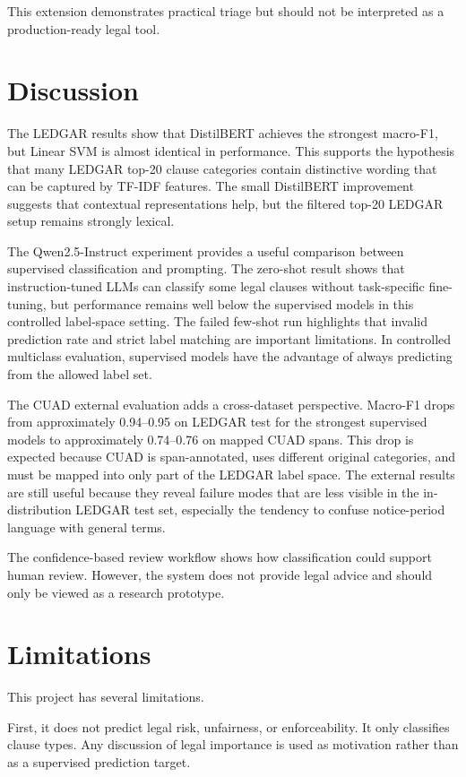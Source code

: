 \documentclass[11pt]{article}
\begin{document}
This extension demonstrates practical triage but should not be interpreted as a production-ready legal tool.

\section{Discussion}

The LEDGAR results show that DistilBERT achieves the strongest macro-F1, but Linear SVM is almost identical in performance. This supports the hypothesis that many LEDGAR top-20 clause categories contain distinctive wording that can be captured by TF-IDF features. The small DistilBERT improvement suggests that contextual representations help, but the filtered top-20 LEDGAR setup remains strongly lexical.

The Qwen2.5-Instruct experiment provides a useful comparison between supervised classification and prompting. The zero-shot result shows that instruction-tuned LLMs can classify some legal clauses without task-specific fine-tuning, but performance remains well below the supervised models in this controlled label-space setting. The failed few-shot run highlights that invalid prediction rate and strict label matching are important limitations. In controlled multiclass evaluation, supervised models have the advantage of always predicting from the allowed label set.

The CUAD external evaluation adds a cross-dataset perspective. Macro-F1 drops from approximately 0.94--0.95 on LEDGAR test for the strongest supervised models to approximately 0.74--0.76 on mapped CUAD spans. This drop is expected because CUAD is span-annotated, uses different original categories, and must be mapped into only part of the LEDGAR label space. The external results are still useful because they reveal failure modes that are less visible in the in-distribution LEDGAR test set, especially the tendency to confuse notice-period language with general terms.

The confidence-based review workflow shows how classification could support human review. However, the system does not provide legal advice and should only be viewed as a research prototype.

\section{Limitations}

This project has several limitations.

First, it does not predict legal risk, unfairness, or enforceability. It only classifies clause types. Any discussion of legal importance is used as motivation rather than as a supervised prediction target.
\end{document}
